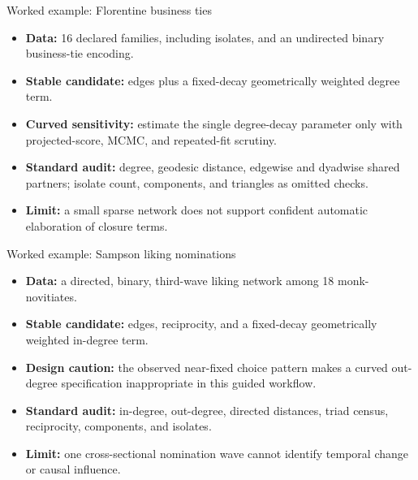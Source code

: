 \documentclass[aspectratio=169,11pt]{beamer}
\newcommand{\term}[1]{\textbf{\color{nupurple}#1}}
\begin{document}
\begin{frame}{Worked example: Florentine business ties}
\begin{itemize}
\item \term{Data:} 16 declared families, including isolates, and an undirected binary business-tie encoding.
\item \term{Stable candidate:} edges plus a fixed-decay geometrically weighted degree term.
\item \term{Curved sensitivity:} estimate the single degree-decay parameter only with projected-score, MCMC, and repeated-fit scrutiny.
\item \term{Standard audit:} degree, geodesic distance, edgewise and dyadwise shared partners; isolate count, components, and triangles as omitted checks.
\item \term{Limit:} a small sparse network does not support confident automatic elaboration of closure terms.
\end{itemize}
\end{frame}

\begin{frame}{Worked example: Sampson liking nominations}
\begin{itemize}
\item \term{Data:} a directed, binary, third-wave liking network among 18 monk-novitiates.
\item \term{Stable candidate:} edges, reciprocity, and a fixed-decay geometrically weighted in-degree term.
\item \term{Design caution:} the observed near-fixed choice pattern makes a curved out-degree specification inappropriate in this guided workflow.
\item \term{Standard audit:} in-degree, out-degree, directed distances, triad census, reciprocity, components, and isolates.
\item \term{Limit:} one cross-sectional nomination wave cannot identify temporal change or causal influence.
\end{itemize}
\end{frame}
\end{document}
